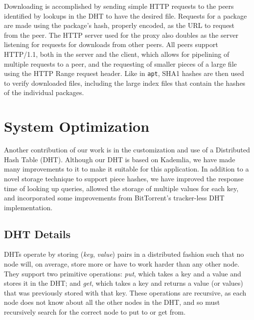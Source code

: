 \documentclass[conference]{IEEEtran}
\begin{document}
Downloading is accomplished by sending simple HTTP requests to the
peers identified by lookups in the DHT to have the desired file.
Requests for a package are made using the package's hash, properly
encoded, as the URL to request from the peer. The HTTP server used
for the proxy also doubles as the server listening for requests for
downloads from other peers. All peers support HTTP/1.1, both in the
server and the client, which allows for pipelining of multiple
requests to a peer, and the requesting of smaller pieces of a large
file using the HTTP Range request header. Like in \texttt{apt}, 
SHA1 hashes are then used to verify downloaded files, including the large
index files that contain the hashes of the individual packages. 


\section{System Optimization}
\label{custom_dht}

Another contribution of our work is in the customization and use of
a Distributed Hash Table (DHT). Although our DHT is based on
Kademlia, we have made many improvements to it to make it suitable
for this application. In addition to a novel storage technique to
support piece hashes, we have improved the response time of looking
up queries, allowed the storage of multiple values for each key, and
incorporated some improvements from BitTorrent's tracker-less DHT
implementation.

\subsection{DHT Details}
\label{dht}

DHTs operate by storing (\emph{key}, \emph{value}) pairs in a
distributed fashion such that no node will, on average, store more or have to work harder
than any other node. They support two primitive operations:
\emph{put}, which takes a key and a value and stores it in the DHT;
and \emph{get}, which takes a key and returns a value (or values)
that was previously stored with that key. These operations are
recursive, as each node does not know about all the other nodes in the
DHT, and so must recursively search for the correct node to put to
or get from.
\end{document}

